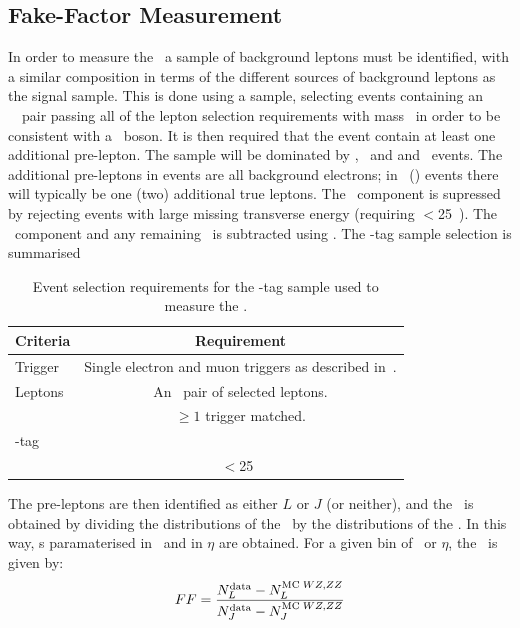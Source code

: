 \subsection{Fake-Factor Measurement}

In order to measure the \fakefactor\ a sample of background leptons must be
identified, with a similar composition in terms of the different sources of
background leptons as the signal sample. This is done using a  sample, selecting 
events containing an \ossf\ \dilep\ pair passing all of the lepton
selection requirements with mass \sstooos\ in order to be consistent with a \Z\
boson. It is then required that the event contain at least one additional
pre-lepton. The sample will be dominated by \Zjets, \WZ\ and and \ZZ\
events. The additional pre-leptons in \Zjets events are all background
electrons; in \WZ\ (\ZZ) events there will typically be one (two) additional
true leptons. The \WZ\ component is supressed by rejecting events with large missing transverse
energy (requiring \Etmiss$<$25~\gev). The \ZZ\ component and any remaining \WZ\
is subtracted using \mc. The \Z-tag sample selection is summarised~

\begin{table}[htbp]
  \centering
  \small
  \begin{tabular}{lc} 
    \hline\hline
    Criteria & Requirement \\
    \hline
    Trigger & Single electron and muon triggers as described in~\sec{triggers}.\\
    Leptons & An \ossf\ pair of selected leptons.\\
            & $\geq 1$ trigger matched. \\
    \Z-tag & \sstooos \\
    \Etmiss & \Etmiss$<$25~\gev \\
    \hline\hline
  \end{tabular}
  \caption{Event selection requirements for the \Z-tag sample used to measure
  the \ffactor.}
  \label{table:Ztag-def}
\end{table}

The pre-leptons are then identified as either $L$ or
$J$ (or neither), and the \fakefactor\ is obtained by dividing the distributions
of the \lljet\ by the distributions of the \sellep. In this way, \fakefactor s
paramaterised in \pT\ and in $\eta$ are obtained. For a given bin of \pT\ or $\eta$, the \ffactor\ is given by:
\begin{equation}
FF = \frac{N^{\rm data}_{L} - N^{{\rm MC}\; WZ,ZZ}_{L}}
{N^{\rm data}_{J} - N^{{\rm MC}\; WZ,ZZ}_{J}}
\end{equation}

